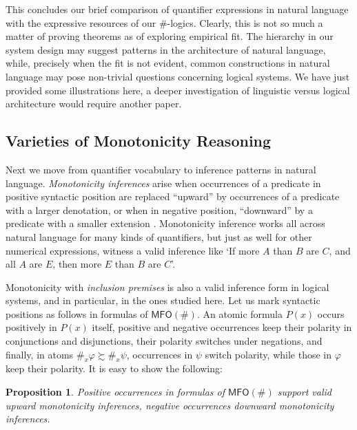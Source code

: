 \documentclass[12pt,oneside,reqno]{amsart}
\newtheorem{proposition}{Proposition}
\theoremstyle{definition}
\begin{document}
This concludes our brief comparison of quantifier expressions in natural language with the expressive resources of our $\#$-logics. Clearly, this is not so much a matter of proving theorems as of exploring empirical fit. The hierarchy in our system design may suggest patterns in the architecture of natural language, while, precisely when the fit is not evident, common constructions in natural language may pose non-trivial questions concerning logical systems. We have just provided some illustrations here, a deeper investigation  of linguistic versus logical architecture would require another paper. 






\subsection{Varieties of Monotonicity Reasoning} \label{section:varmon}

Next we move from quantifier vocabulary to  inference patterns in natural language. \emph{Monotonicity inferences} arise when  occurrences of a predicate in positive syntactic position are replaced ``upward'' by occurrences of a predicate with a larger denotation, or when in negative position, ``downward'' by a predicate with a smaller extension \citep{vanBenthem1985,Sanchez91,IcardMoss2014}. Monotonicity inference works all across natural language for many kinds of quantifiers, but just as well for other numerical  expressions, witness a valid inference like `If more $A$ than $B$ are $C$, and all $A$ are $E$, then more $E$ than $B$ are $C$'.


Monotonicity with \emph{inclusion premises} is also a valid inference form in logical systems, and in particular, in the ones studied here. Let us mark  syntactic positions as follows in  formulas of $\mathsf{MFO}(\#)$.
An atomic formula $P(x)$ occurs positively in $P(x)$ itself, positive and negative occurrences keep their polarity in conjunctions and disjunctions, their polarity switches under negations, and finally, 
in atoms $\#_x\varphi \succsim \#_x \psi$, occurrences in $\psi$ switch  polarity, while those in $\varphi$ keep their polarity. It is easy to show the following:

\begin{proposition} Positive occurrences in formulas of $\mathsf{MFO(\#)}$ support valid upward monotonicity inferences, negative occurrences downward monotonicity inferences.\end{proposition}
\end{document}
